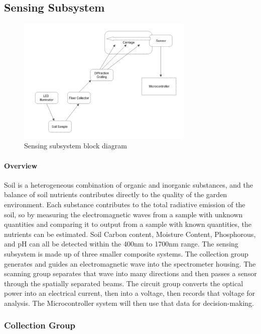 \subsection{Sensing Subsystem}
\label{sec:sensing_subsystem}

\begin{figure}[H]
    \caption{Sensing subsystem block diagram}
    \centering
    \includegraphics[width=0.75\textwidth]{images/OpticsBlockDiagram.png}
\end{figure}


\paragraph{Overview} Soil is a heterogeneous combination of organic and inorganic substances, and the balance of soil nutrients contributes directly to the quality of the garden environment. Each substance contributes to the total radiative emission of the soil, so by measuring the electromagnetic waves from a sample with unknown quantities and comparing it to output from a sample with known quantities, the nutrients can be estimated. Soil Carbon content, Moisture Content, Phosphorous, and pH can all be detected within the 400nm to 1700nm range.
The sensing subsystem is made up of three smaller composite systems. The collection group generates and guides an electromagnetic wave into the spectrometer housing. The scanning group separates that wave into many directions and then passes a sensor through the spatially separated beams. The circuit group converts the optical power into an electrical current, then into a voltage, then records that voltage for analysis. The Microcontroller system will then use that data for decision-making.

\subsubsection{Collection Group}

